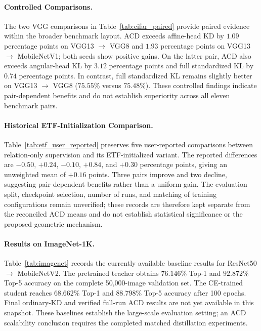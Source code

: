\paragraph{Controlled Comparisons.}
The two VGG comparisons in Table~\ref{tab:cifar_paired} provide
paired evidence within the broader benchmark layout.
ACD exceeds affine-head KD by $1.09$ percentage points on
VGG13 $\to$ VGG8 and $1.93$ percentage points on
VGG13 $\to$ MobileNetV1; both seeds show positive gains.
On the latter pair, ACD also exceeds angular-head KL by $3.12$
percentage points and full standardized KL by $0.74$ percentage points.
In contrast, full standardized KL remains slightly better on
VGG13 $\to$ VGG8 ($75.55\%$ versus $75.48\%$).
These controlled findings indicate pair-dependent benefits and do not
establish superiority across all eleven benchmark pairs.

\paragraph{Historical ETF-Initialization Comparison.}
Table~\ref{tab:etf_user_reported} preserves five user-reported comparisons
between relation-only supervision and its ETF-initialized variant.
The reported differences are $-0.50$, $+0.24$, $-0.10$, $+0.84$, and
$+0.30$ percentage points, giving an unweighted mean of $+0.16$ points.
Three pairs improve and two decline, suggesting pair-dependent benefits
rather than a uniform gain. The evaluation split, checkpoint selection,
number of runs, and matching of training configurations remain unverified;
these records are therefore kept separate from the reconciled ACD means
and do not establish statistical significance or the proposed geometric mechanism.

\paragraph{Results on ImageNet-1K.}
Table~\ref{tab:imagenet} records the currently available baseline results
for ResNet50 $\to$ MobileNetV2. The pretrained teacher obtains
$76.146\%$ Top-1 and $92.872\%$ Top-5 accuracy on the complete
50,000-image validation set. The CE-trained student reaches
$68.662\%$ Top-1 and $88.798\%$ Top-5 accuracy after 100 epochs.
Final ordinary-KD and verified full-run ACD results are not yet available
in this snapshot. These baselines establish the large-scale evaluation
setting; an ACD scalability conclusion requires the completed matched
distillation experiments.

